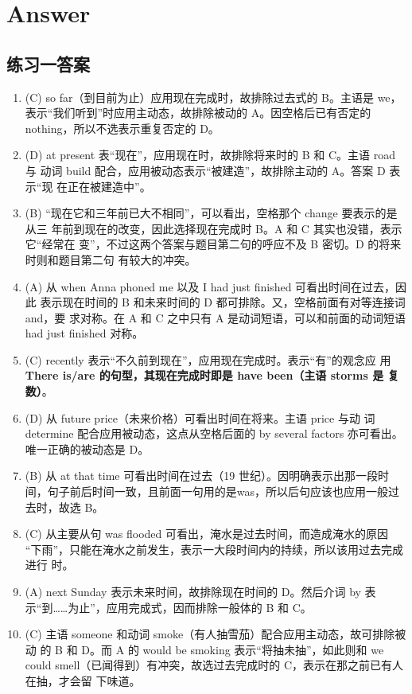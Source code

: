 \section{Answer}

\subsection{练习一答案}

\begin{enumerate}
\item (C) so far（到目前为止）应用现在完成时，故排除过去式的 B。主语是 we，表示“我们听到”时应用主动态，故排除被动的 A。因空格后已有否定的 nothing，所以不选表示重复否定的 D。

\item (D) at present 表“现在”，应用现在时，故排除将来时的 B 和 C。主语 road 与
  动词 build 配合，应用被动态表示“被建造”，故排除主动的 A。答案 D 表示“现
  在正在被建造中”。

\item (B) “现在它和三年前已大不相同”，可以看出，空格那个 change 要表示的是从三
  年前到现在的改变，因此选择现在完成时 B。A 和 C 其实也没错，表示它“经常在
  变”，不过这两个答案与题目第二句的呼应不及 B 密切。D 的将来时则和题目第二句
  有较大的冲突。

\item (A) 从 when Anna phoned me 以及 I had just finished 可看出时间在过去，因此
  表示现在时间的 B 和未来时间的 D 都可排除。又，空格前面有对等连接词 and，要
  求对称。在 A 和 C 之中只有 A 是动词短语，可以和前面的动词短语 had just
  finished 对称。

\item (C) recently 表示“不久前到现在”，应用现在完成时。表示“有”的观念应
  用 \textbf{There is/are 的句型，其现在完成时即是 have been（主语 storms 是
  复数）}。

\item (D) 从 future price（未来价格）可看出时间在将来。主语 price 与动
  词 determine 配合应用被动态，这点从空格后面的 by several factors 亦可看出。
  唯一正确的被动态是 D。

\item (B) 从 at that time 可看出时间在过去（19 世纪）。因明确表示出那一段时
  间，句子前后时间一致，且前面一句用的是was，所以后句应该也应用一般过去时，故选 B。

\item (C) 从主要从句 was flooded 可看出，淹水是过去时间，而造成淹水的原因
  “下雨”，只能在淹水之前发生，表示一大段时间内的持续，所以该用过去完成进行
  时。

\item (A) next Sunday 表示未来时间，故排除现在时间的 D。然后介词 by 表示“到……为止”，应用完成式，因而排除一般体的 B 和 C。

\item (C) 主语 someone 和动词 smoke（有人抽雪茄）配合应用主动态，故可排除被动
  的 B 和 D。而 A 的 would be smoking 表示“将抽未抽”，如此则和 we could
  smell（已闻得到）有冲突，故选过去完成时的 C，表示在那之前已有人在抽，才会留
  下味道。

\end{enumerate}

